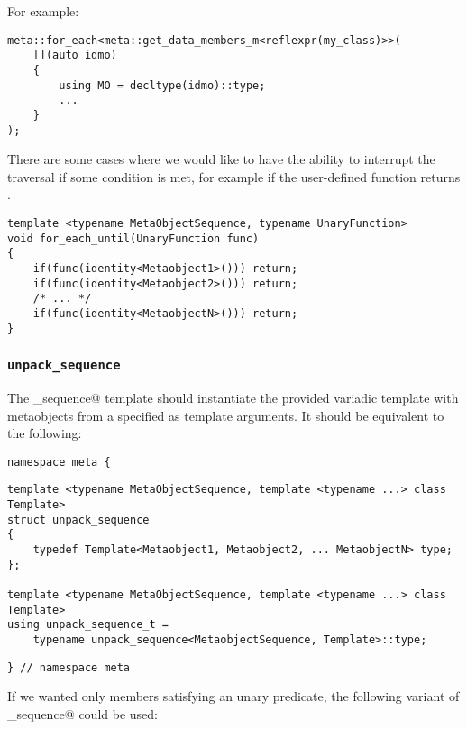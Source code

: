 For example:

\begin{verbatim}
meta::for_each<meta::get_data_members_m<reflexpr(my_class)>>(
	[](auto idmo)
	{
		using MO = decltype(idmo)::type;
		...
	}
);
\end{verbatim}

There are some cases where we would like to have the ability to interrupt
the traversal if some condition is met, for example if the user-defined
function returns \verb@true@.

\begin{verbatim}
template <typename MetaObjectSequence, typename UnaryFunction>
void for_each_until(UnaryFunction func)
{
	if(func(identity<Metaobject1>())) return;
	if(func(identity<Metaobject2>())) return;
	/* ... */
	if(func(identity<MetaobjectN>())) return;
}
\end{verbatim}

\subsubsection{\texttt{unpack\_sequence}}
\label{fac-unpack-sequence}

The \verb@unpack_sequence@ template should instantiate the provided variadic
template with metaobjects from a specified  as template
arguments. It should be equivalent to the following:

\begin{verbatim}
namespace meta {
\end{verbatim}
\begin{verbatim}
template <typename MetaObjectSequence, template <typename ...> class Template>
struct unpack_sequence
{
	typedef Template<Metaobject1, Metaobject2, ... MetaobjectN> type;
};

template <typename MetaObjectSequence, template <typename ...> class Template>
using unpack_sequence_t =
	typename unpack_sequence<MetaobjectSequence, Template>::type;
\end{verbatim}
\begin{verbatim}
} // namespace meta
\end{verbatim}

If we wanted only members satisfying an unary predicate, the following
variant of \verb@unpack_sequence@ could be used:

